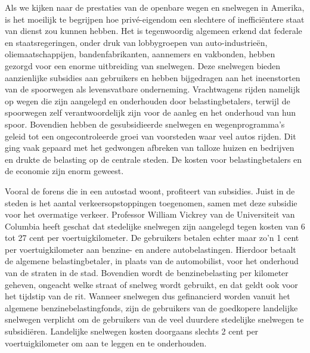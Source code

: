 \documentclass[
  a5paper,
  smalldemyvopaper,10pt,twoside,onecolumn,openright,extrafontsizes,hidelinks]{memoir}
\begin{document}
Als we kijken naar de prestaties van de openbare wegen en snelwegen in
Amerika, is het moeilijk te begrijpen hoe privé-eigendom een slechtere
of inefficiëntere staat van dienst zou kunnen hebben. Het is
tegenwoordig algemeen erkend dat federale en staatsregeringen, onder
druk van lobbygroepen van auto-industrieën, oliemaatschappijen,
bandenfabrikanten, aannemers en vakbonden, hebben gezorgd voor een
enorme uitbreiding van snelwegen. Deze snelwegen bieden aanzienlijke
subsidies aan gebruikers en hebben bijgedragen aan het ineenstorten van
de spoorwegen als levensvatbare onderneming. Vrachtwagens rijden
namelijk op wegen die zijn aangelegd en onderhouden door
belastingbetalers, terwijl de spoorwegen zelf verantwoordelijk zijn voor
de aanleg en het onderhoud van hun spoor. Bovendien hebben de
gesubsidieerde snelwegen en wegenprogramma's geleid tot een
ongecontroleerde groei van voorsteden waar veel autos rijden. Dit ging
vaak gepaard met het gedwongen afbreken van talloze huizen en bedrijven
en drukte de belasting op de centrale steden. De kosten voor
belastingbetalers en de economie zijn enorm geweest.

Vooral de forens die in een autostad woont, profiteert van subsidies.
Juist in de steden is het aantal verkeersopstoppingen toegenomen, samen
met deze subsidie voor het overmatige verkeer. Professor William Vickrey
van de Universiteit van Columbia heeft geschat dat stedelijke snelwegen
zijn aangelegd tegen kosten van 6 tot 27 cent per voertuigkilometer. De
gebruikers betalen echter maar zo'n 1 cent per voertuigkilometer aan
benzine- en andere autobelastingen. Hierdoor betaalt de algemene
belastingbetaler, in plaats van de automobilist, voor het onderhoud van
de straten in de stad. Bovendien wordt de benzinebelasting per kilometer
geheven, ongeacht welke straat of snelweg wordt gebruikt, en dat geldt
ook voor het tijdstip van de rit. Wanneer snelwegen dus gefinancierd
worden vanuit het algemene benzinebelastingfonds, zijn de gebruikers van
de goedkopere landelijke snelwegen verplicht om de gebruikers van de
veel duurdere stedelijke snelwegen te subsidiëren. Landelijke snelwegen
kosten doorgaans slechts 2 cent per voertuigkilometer om aan te leggen
en te onderhouden.
\end{document}
